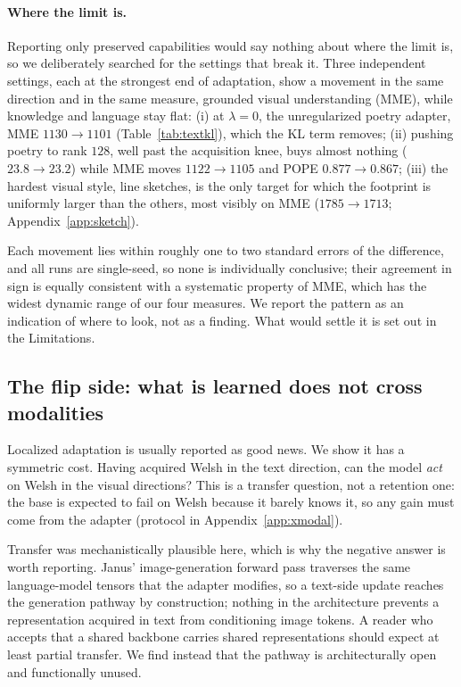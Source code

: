 \documentclass{article}
\begin{document}
\paragraph{Where the limit is.}
Reporting only preserved capabilities would say nothing about where the limit
is, so we deliberately searched for the settings that break it. Three
independent settings, each at the strongest end of adaptation, show a movement
in the same direction and in the same measure, grounded visual understanding
(MME), while knowledge and language stay flat:
(i) at $\lambda=0$, the unregularized poetry adapter, MME $1130\to1101$
(Table~\ref{tab:textkl}), which the KL term removes;
(ii) pushing poetry to rank $128$, well past the acquisition knee, buys almost
nothing ($23.8\to23.2$) while MME moves $1122\to1105$ and POPE $0.877\to0.867$;
(iii) the hardest visual style, line sketches, is the only target for which the
footprint is uniformly larger than the others, most visibly on MME
($1785\to1713$; Appendix~\ref{app:sketch}).

Each movement lies within roughly one to two standard errors of the difference,
and all runs are single-seed, so none is individually conclusive; their agreement
in sign is equally consistent with a systematic property of MME, which has the
widest dynamic range of our four measures. We report the pattern as an
indication of where to look, not as a finding. What would settle it is set out in
the Limitations.

\subsection{The flip side: what is learned does not cross modalities}
Localized adaptation is usually reported as good news. We show it has a
symmetric cost. Having acquired Welsh in the text direction, can the model
\emph{act} on Welsh in the visual directions? This is a transfer question, not a
retention one: the base is expected to fail on Welsh because it barely knows it,
so any gain must come from the adapter (protocol in Appendix~\ref{app:xmodal}).

Transfer was mechanistically plausible here, which is why the negative answer is
worth reporting. Janus' image-generation forward pass traverses the same
language-model tensors that the adapter modifies, so a text-side update reaches
the generation pathway by construction; nothing in the architecture prevents a
representation acquired in text from conditioning image tokens. A reader who
accepts that a shared backbone carries shared representations should expect at
least partial transfer. We find instead that the pathway is architecturally open
and functionally unused.
\end{document}
